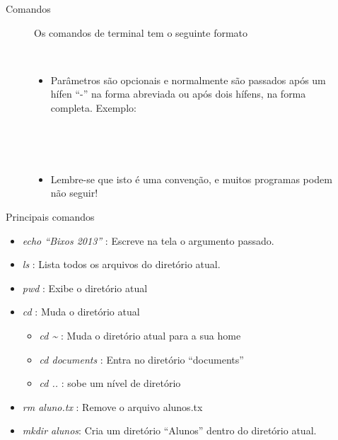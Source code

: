 \documentclass{beamer}
\begin{document}
\begin{frame}{Comandos}
    \begin{figure}[h]
        \centering
        Os comandos de terminal tem o seguinte formato \newline \\
        \begin{shell}
        \end{shell}
        \\
        \begin{itemize}
        \item Parâmetros são opcionais e normalmente são passados após um hífen
          ``-'' na forma abreviada ou após dois hífens, na forma completa.
          Exemplo:
        \end{itemize}
        \begin{shell}
          \\
         \end{shell}
        \\
        \begin{itemize}
        \item{Lembre-se que isto é uma convenção, e muitos programas podem não
          seguir!}
        \end{itemize}
    \end{figure}
\end{frame}

\begin{frame}{Principais comandos}
   \begin{itemize}
   \item \emph{echo ``Bixos 2013''} : Escreve na tela o argumento passado.
   \item \emph{ls} : Lista todos os arquivos do diretório atual.
   \item \emph{pwd} : Exibe o diretório atual
   \item \emph{cd} : Muda o diretório atual
     \begin{itemize}
     \item \emph{cd \~{}} : Muda o diretório atual para a sua home
     \item \emph{cd documents} : Entra no diretório ``documents''
     \item \emph{cd ..} : sobe um nível de diretório
     \end{itemize}
   \item \emph{rm aluno.tx} : Remove o arquivo alunos.tx
   \item \emph{mkdir alunos}: Cria um diretório ``Alunos'' dentro do
     diretório atual.
   \end{itemize}
\end{frame}
\end{document}
